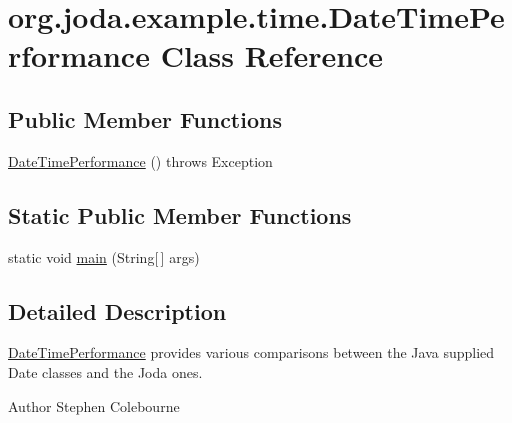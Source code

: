 \hypertarget{classorg_1_1joda_1_1example_1_1time_1_1_date_time_performance}{\section{org.\-joda.\-example.\-time.\-Date\-Time\-Performance Class Reference}
\label{classorg_1_1joda_1_1example_1_1time_1_1_date_time_performance}
}
\subsection*{Public Member Functions}
\begin{DoxyCompactItemize}
\item 
\hyperlink{classorg_1_1joda_1_1example_1_1time_1_1_date_time_performance_a2f779b0e8a9be911a41a0938a607c60a}{Date\-Time\-Performance} ()  throws Exception 
\end{DoxyCompactItemize}
\subsection*{Static Public Member Functions}
\begin{DoxyCompactItemize}
\item 
static void \hyperlink{classorg_1_1joda_1_1example_1_1time_1_1_date_time_performance_a29d208218e068fc776e4f645800f3753}{main} (String\mbox{[}$\,$\mbox{]} args)
\end{DoxyCompactItemize}


\subsection{Detailed Description}
\hyperlink{classorg_1_1joda_1_1example_1_1time_1_1_date_time_performance}{Date\-Time\-Performance} provides various comparisons between the Java supplied Date classes and the Joda ones.

\begin{DoxyAuthor}{Author}
Stephen Colebourne 
\end{DoxyAuthor}


